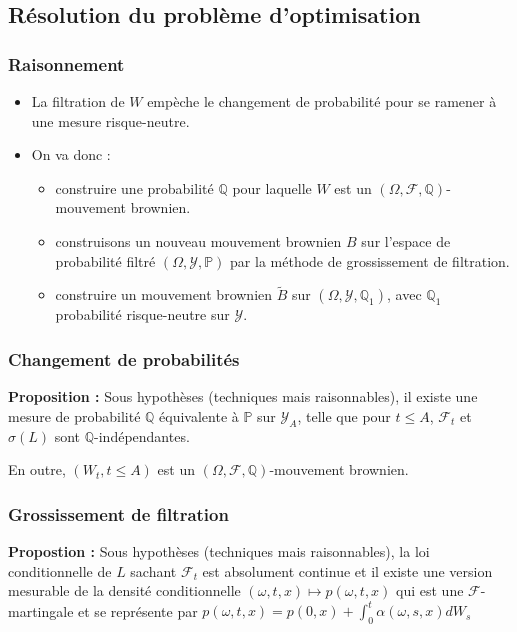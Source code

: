 \documentclass{beamer}
\begin{document}
\subsection{Résolution du problème d'optimisation}
\begin{frame}
\frametitle{Raisonnement}
\begin{itemize}
\item La filtration de $W$ empèche le changement de probabilité pour se ramener à une mesure risque-neutre.
\item On va donc : 
\begin{itemize}
\item construire une probabilité $\mathbb{Q}$ pour laquelle $W$ est un $(\Omega, \mathcal{F}, \mathbb{Q})$-mouvement brownien.
\item construisons un nouveau mouvement brownien $B$ sur l'espace de probabilité filtré  $(\Omega, \mathcal{Y}, \mathbb{P})$ par la méthode de grossissement de filtration.\\
\item construire un mouvement brownien $\tilde{B}$ sur $(\Omega, \mathcal{Y}, \mathbb{Q}_1)$, avec $\mathbb{Q}_1$ probabilité risque-neutre sur $\mathcal{Y}$.
\end{itemize}
\end{itemize} 
\end{frame}

\begin{frame}
\frametitle{Changement de probabilités}
\textbf{Proposition : } Sous hypothèses (techniques mais raisonnables), il existe une mesure de probabilité $\mathbb{Q}$ équivalente à $\mathbb{P}$ sur $\mathcal{Y}_A$, telle que pour $t \leq A$, $\mathcal{F}_t$ et $\sigma \left( L \right)$ sont $\mathbb{Q}$-indépendantes.
\par En outre, $\left( W_t, t \leq A \right)$ est un $\left(\Omega, \mathcal{F}, \mathbb{Q} \right)$-mouvement brownien.
\end{frame}

\begin{frame}
\frametitle{Grossissement de filtration}
\textbf{Propostion : } Sous hypothèses (techniques mais raisonnables), la loi conditionnelle de $L$ sachant $\mathcal{F}_t$ est absolument continue et il existe une version mesurable de la densité conditionnelle $(\omega, t, x) \mapsto p(\omega, t, x)$ qui est une $\mathcal{F}$-martingale et se représente par $ p(\omega, t, x) = p(0, x) + \int_{0}^{t}\alpha(\omega, s, x) dW_s$\

\end{frame}
\end{document}

